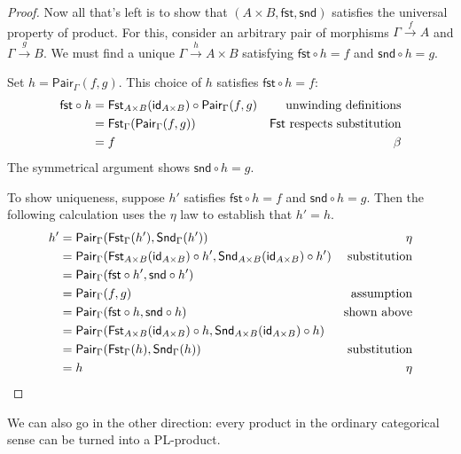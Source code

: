 \begin{proof}
  Now all that's left is to show that \((A\times B, \mathsf{fst},\mathsf{snd})\) satisfies the universal property
  of product. For this, consider an arbitrary pair of morphisms \(\Gamma \xrightarrow{f} A\) and \(\Gamma\xrightarrow{g} B\).
  We must find a unique \(\Gamma \xrightarrow{h} A \times B\) satisfying \(\mathsf{fst} \circ h = f\) and \(\mathsf{snd} \circ h = g\).

  Set \(h = \mathsf{Pair}_\Gamma(f,g)\). This choice of \(h\) satisfies \(\mathsf{fst}\circ h = f\):
  \begin{align*}
    \mathsf{fst} \circ h
    &= \mathsf{Fst}_{A\times B}(\mathsf{id}_{A\times B}) \circ \mathsf{Pair}_{\Gamma}(f,g) & \text{unwinding definitions} \\
    &= \mathsf{Fst}_{\Gamma}(\mathsf{Pair}_{\Gamma}(f,g)) & \text{\(\mathsf{Fst}\) respects substitution} \\
    &= f & \text{\(\beta\)}
  \end{align*}
  The symmetrical argument shows \(\mathsf{snd} \circ h = g\).

  To show uniqueness, suppose \(h'\) satisfies \(\mathsf{fst} \circ h = f\) and \(\mathsf{snd} \circ h = g\).
  Then the following calculation uses the \(\eta\) law to establish that \(h' = h\).
  \begin{align*}
    h' &= \mathsf{Pair}_\Gamma(\mathsf{Fst}_\Gamma(h'),\mathsf{Snd}_\Gamma(h')) & \text{\(\eta\)} \\
     &= \mathsf{Pair}_\Gamma(\mathsf{Fst}_{A\times B}(\mathsf{id}_{A\times B})\circ h',\mathsf{Snd}_{A\times B}(\mathsf{id}_{A\times B})\circ h') & \text{substitution} \\
     &= \mathsf{Pair}_\Gamma(\mathsf{fst}\circ h',\mathsf{snd}\circ h') & \\
     &= \mathsf{Pair}_\Gamma(f,g) & \text{assumption} \\
     &= \mathsf{Pair}_\Gamma(\mathsf{fst}\circ h,\mathsf{snd} \circ h) & \text{shown above} \\
     &= \mathsf{Pair}_\Gamma(\mathsf{Fst}_{A\times B}(\mathsf{id}_{A\times B})\circ h,\mathsf{Snd}_{A\times B}(\mathsf{id}_{A\times B}) \circ h) & \\
     &= \mathsf{Pair}_\Gamma(\mathsf{Fst}_\Gamma(h),\mathsf{Snd}_\Gamma(h)) & \text{substitution} \\
     &= h & \text{\(\eta\)}
  \end{align*}

\end{proof}

We can also go in the other direction: every product in the ordinary categorical sense can be turned into a PL-product.

